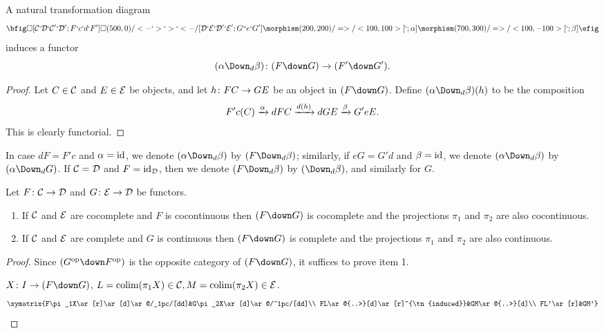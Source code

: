 \documentclass[10pt]{amsart}
\begin{document}
\begin{lemma}\label{mor of downs}

A natural transformation diagram
$$\bfig
\square[\mcC`\mcD`\mcC'`\mcD';F`c`d`F']
\square(500,0)/<-`>`>`<-/[\mcD`\mcE`\mcD'`\mcE';G``e`G']
\morphism(200,200)/=>/<100,100>[`;\alpha]
\morphism(700,300)/=>/<100,-100>[`;\beta]
\efig$$ induces a functor $$(\alpha\Down_d\beta)\taking (F\down G)\to (F'\down G').$$

\end{lemma}

\begin{proof}

Let $C\in\mathcal{C}$ and $E\in\mathcal{E}$ be objects, and let $h\colon FC\rightarrow GE$ be an object in $(F\down G)$.  Define $(\alpha\Down_d\beta)(h)$ to be the composition $$F'c(C)\xrightarrow{\alpha}dFC\xrightarrow{d(h)}dGE\xrightarrow{\beta}G'eE.$$  This is clearly functorial.

\end{proof}

In case $dF=F'c$ and $\alpha=\textnormal{id}$, we denote $(\alpha\Down_d\beta)$ by $(F\Down_d\beta)$; similarly, if
$eG=G'd$ and $\beta=\textnormal{id}$, we denote $(\alpha\Down_d\beta)$ by $(\alpha\Down_d G)$.  If $\mathcal{C}=\mathcal{D}$ and $F=\textnormal{id}_\mathcal{D}$, then we denote $(F\Down_d\beta)$ by $(\Down_d\beta)$, and similarly for $G$.

\begin{lemma}\label{col lim com cat}

Let $F\colon \mathcal{C}\rightarrow\mathcal{D}$ and $G\colon \mathcal{E}\rightarrow\mathcal{D}$ be functors.  \begin{enumerate} \item If $\mathcal{C}$ and $\mathcal{E}$ are cocomplete and $F$ is
cocontinuous then $(F\down G)$ is cocomplete and the projections $\pi_1$ and $\pi_2$ are also cocontinuous. \item If $\mathcal{C}$ and
$\mathcal{E}$ are complete and $G$ is continuous then $(F\down G)$ is complete and the projections $\pi_1$ and $\pi_2$ are also
continuous.\end{enumerate}

\end{lemma}

\begin{proof}

Since $(G\op\down F\op)$ is the opposite category of $(F\down G)$, it suffices to prove item 1.

$X\taking I\to(F\down G)$, $L=\mathop{\textnormal{colim}}(\pi_1 X)\in\mathcal{C}, M=\mathop{\textnormal{colim}}(\pi_2 X)\in\mathcal{E}$.
$$\xymatrix{F\pi_1X\ar[r]\ar[d]\ar@/_1pc/[dd]&G\pi_2X\ar[d]\ar@/^1pc/[dd]\\ FL\ar@{..>}[d]\ar[r]^{\tn{induced}}&GM\ar@{..>}[d]\\
FL'\ar[r]&GM'}$$

\end{proof}
\end{document}
